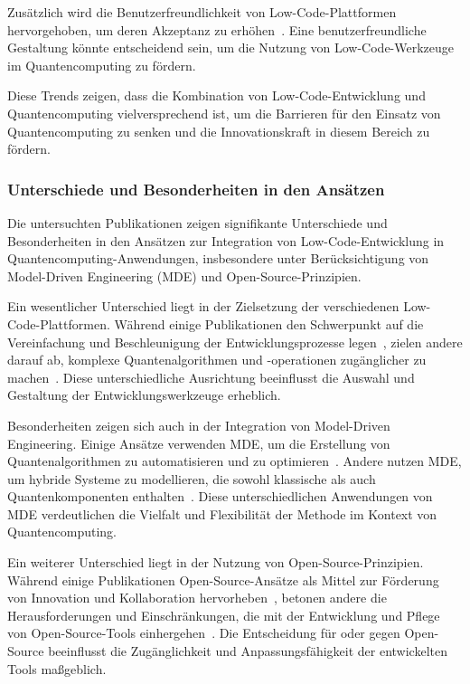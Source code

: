 Zusätzlich wird die Benutzerfreundlichkeit von Low-Code-Plattformen hervorgehoben, um deren Akzeptanz zu erhöhen~\cite{Pinho_2022, Prinz_2021}. 
Eine benutzerfreundliche Gestaltung könnte entscheidend sein, um die Nutzung von Low-Code-Werkzeuge im Quantencomputing zu fördern.

Diese Trends zeigen, dass die Kombination von Low-Code-Entwicklung und Quantencomputing vielversprechend ist, um die 
Barrieren für den Einsatz von Quantencomputing zu senken und die Innovationskraft in diesem Bereich zu fördern.

\subsubsection{Unterschiede und Besonderheiten in den Ansätzen}

Die untersuchten Publikationen zeigen signifikante Unterschiede und Besonderheiten in den Ansätzen 
zur Integration von Low-Code-Entwicklung in Quantencomputing-Anwendungen, insbesondere unter Berücksichtigung 
von Model-Driven Engineering (MDE) und Open-Source-Prinzipien.

Ein wesentlicher Unterschied liegt in der Zielsetzung der verschiedenen Low-Code-Plattformen. 
Während einige Publikationen den Schwerpunkt auf die Vereinfachung und Beschleunigung der 
Entwicklungsprozesse legen~\cite{Sahay_2020, Khorram_2020}, zielen andere darauf ab, komplexe 
Quantenalgorithmen und -operationen zugänglicher zu machen~\cite{Gemeinhardt_2021, Gemeinhardt_2023}. 
Diese unterschiedliche Ausrichtung beeinflusst die Auswahl und Gestaltung der Entwicklungswerkzeuge erheblich.

Besonderheiten zeigen sich auch in der Integration von Model-Driven Engineering. Einige Ansätze 
verwenden MDE, um die Erstellung von Quantenalgorithmen zu automatisieren und zu optimieren~\cite{Moin_2021, Perez-Castillo_2022}. 
Andere nutzen MDE, um hybride Systeme zu modellieren, die sowohl klassische als auch Quantenkomponenten 
enthalten~\cite{Weder_2020, Polat_2024}. Diese unterschiedlichen Anwendungen von MDE verdeutlichen die Vielfalt 
und Flexibilität der Methode im Kontext von Quantencomputing.

Ein weiterer Unterschied liegt in der Nutzung von Open-Source-Prinzipien. Während einige Publikationen Open-Source-Ansätze 
als Mittel zur Förderung von Innovation und Kollaboration hervorheben~\cite{Amato_2023, Ahmad_2023}, betonen andere die 
Herausforderungen und Einschränkungen, die mit der Entwicklung und Pflege von Open-Source-Tools einhergehen~\cite{Sanchez_2021}. 
Die Entscheidung für oder gegen Open-Source beeinflusst die Zugänglichkeit und Anpassungsfähigkeit der entwickelten Tools maßgeblich.

